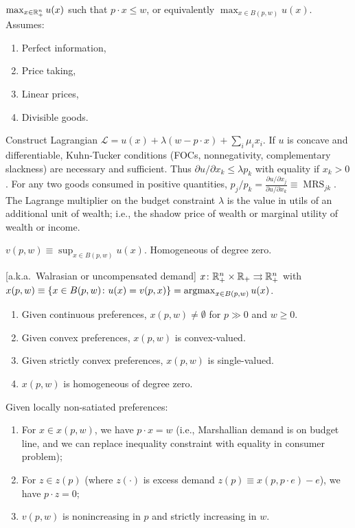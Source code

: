 \documentclass[8pt,letterpaper, landscape]{extarticle} %
\begin{document}
\begin{multicols}{3}
\begin{description}
 $ \max_{x \in \mathbb{R}^{n}_{+}} u(x) $ such that $ p \cdot x \leq w $, or equivalently $ \max_{x \in B(p,w)} u(x) $. Assumes:
\begin{enumerate}
\item Perfect information,
\item Price taking,
\item Linear prices,
\item Divisible goods.
\end{enumerate}
Construct Lagrangian $ \mathcal{L} = u(x) + \lambda (w - p \cdot x) + \sum_{i} \mu_i x_i $. If $ u $ is concave and differentiable, Kuhn-Tucker conditions (FOCs, nonnegativity, complementary slackness) are necessary and sufficient. Thus $ \partial u / \partial x_k \leq \lambda p_k $ with equality if $ x_k > 0 $. For any two goods consumed in positive quantities, $ p_j / p_k = \frac{\partial u / \partial x_j}{\partial u / \partial x_k} \equiv \operatorname{MRS}_{jk} $. The Lagrange multiplier on the budget constraint $ \lambda $ is the value in utils of an additional unit of wealth; i.e., the shadow price of wealth or marginal utility of wealth or income.

 $ v(p, w) \equiv \sup_{x \in B(p,w)} u(x) $. Homogeneous of degree zero.

 [a.k.a.\ Walrasian or uncompensated demand] $ x \colon \mathbb{R}^{n}_{+} \times \mathbb{R}_{+} \rightrightarrows \mathbb{R}^{n}_{+} $ with $ x(p,w) \equiv \{ x \in B(p,w) \colon u(x) = v(p,x) \} = \operatorname*{argmax}_{x \in B(p,w)} u(x) $.
\begin{enumerate}
\item Given continuous preferences, $ x(p, w) \neq \emptyset $ for $ p \gg 0 $ and $ w \geq 0 $.
\item Given convex preferences, $ x(p,w) $ is convex-valued.
\item Given strictly convex preferences, $ x(p,w) $ is single-valued.
\item $ x(p,w) $ is homogeneous of degree zero.
\end{enumerate}

 Given locally non-satiated preferences:
\begin{enumerate}
\item For $ x \in x(p,w) $, we have $ p \cdot x = w $ (i.e., Marshallian demand is on budget line, and we can replace inequality constraint with equality in consumer problem);
\item For $ z \in z(p) $ (where $ z (\cdot) $ is excess demand $ z(p) \equiv x(p, p \cdot e) - e  $), we have $ p \cdot z = 0 $;
\item $ v(p,w) $ is nonincreasing in $ p $ and strictly increasing in $ w $.
\end{enumerate}


\end{description}
\end{multicols}
\end{document}
